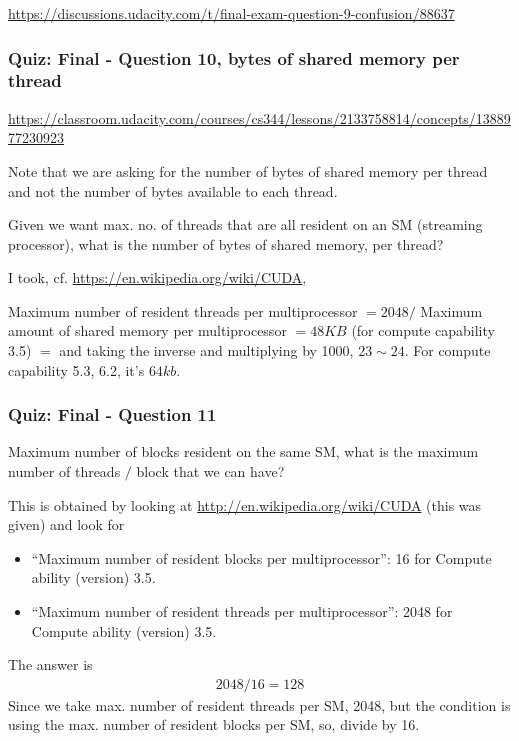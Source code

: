\documentclass[10pt]{amsart}
\begin{document}
\begin{multicols*}{2}
\url{https://discussions.udacity.com/t/final-exam-question-9-confusion/88637}


\subsubsection{Quiz: Final - Question 10, bytes of shared memory per thread}

\url{https://classroom.udacity.com/courses/cs344/lessons/2133758814/concepts/1388977230923}

Note that we are asking for the number of bytes of shared memory per thread and not the number of bytes available to each thread.

Given we want max. no. of threads that are all resident on an SM (streaming processor), what is the number of bytes of shared memory, per thread?  

I took, cf. \url{https://en.wikipedia.org/wiki/CUDA}, 

Maximum number of resident threads per multiprocessor $ = 2048 / $ Maximum amount of shared memory per multiprocessor $= 48 KB$ (for compute capability 3.5) $= $ and taking the inverse and multiplying by 1000, $23 \sim 24$.  For compute capability 5.3, 6.2, it's $64kb$.  


\subsubsection{Quiz: Final - Question 11}

Maximum number of blocks resident on the same SM, what is the maximum number of threads $/$ block that we can have?

This is obtained by looking at \url{http://en.wikipedia.org/wiki/CUDA} (this was given) and look for
\begin{itemize}
\item ``Maximum number of resident blocks per multiprocessor'': 16 for Compute ability (version) 3.5.
\item ``Maximum number of resident threads per multiprocessor'': 2048 for Compute ability (version) 3.5.
  \end{itemize}

The answer is
\begin{equation}
\begin{gathered}
\boxed{ 2048 / 16 = 128 }
  \end{gathered}
  \end{equation}
Since we take max. number of resident threads per SM, 2048, but the condition is using the max. number of resident blocks per SM, so, divide by 16.  


\end{multicols*}
\end{document}
